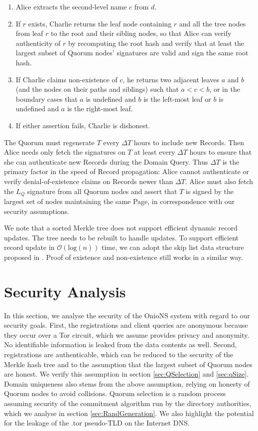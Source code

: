 \documentclass[conference]{IEEEtran}
\begin{document}
\begin{enumerate}
	\item Alice extracts the second-level name $ c $ from $ d $.
	\item If $ r $ exists, Charlie returns the leaf node containing $ r $ and all the tree nodes from leaf $ r $ to the root and their sibling nodes, so that Alice can verify authenticity of $ r $ by recomputing the root hash and verify that at least the largest subset of Quorum nodes' signatures are valid and sign the same root hash.	
	\item If Charlie claims non-existence of $ c $, he returns two adjacent leaves $ a $ and $ b $ (and the nodes on their paths and siblings) such that $ a < c < b $, or in the boundary cases that $ a $ is undefined and $ b $ is the left-most leaf or $ b $ is undefined and $ a $ is the right-most leaf.
	\item If either assertion fails, Charlie is dishonest.
\end{enumerate}

The Quorum must regenerate $ T $ every $ \Delta T $ hours to include new Records. Then Alice needs only fetch the signatures on $ T $ at least every $ \Delta T $ hours to ensure that she can authenticate new Records during the Domain Query. Thus $ \Delta T $ is the primary factor in the speed of Record propagation: Alice cannot authenticate or verify denial-of-existence claims on Records newer than $ \Delta T $. Alice must also fetch the $ L_{Q} $ signature from all Quorum nodes and assert that $ T $ is signed by the largest set of nodes maintaining the same Page, in correspondence with our security assumptions.

We note that a sorted Merkle tree does not support efficient dynamic record updates. The tree needs to be rebuilt to handle updates. To support efficient record update in $ \mathcal{O}(\mathrm{log}(n)) $ time, we can adopt the skip list data structure proposed in \cite{goodrich2001implementation}. Proof of existence and non-existence still works in a similar way.

\section{Security Analysis}
\label{sec:Analysis}

In this section, we analyse the security of the OnioNS system with regard to our security goals. First, the registrations and client queries are anonymous because they occur over a Tor circuit, which we assume provides privacy and anonymity. No identifiable information is leaked from the data contents as well. Second, registrations are authenticable, which can be reduced to the security of the Merkle hash tree and to the assumption that the largest subset of Quorum nodes are honest. We verify this assumption in section \ref{sec:QSelection} and \ref{sec:qSize}. Domain uniqueness also stems from the above assumption, relying on honesty of Quorum nodes to avoid collisions. Quorum selection is a random process assuming security of the commitment algorithm run by the directory authorities, which we analyse in section \ref{sec:RandGeneration}. We also highlight the potential for the leakage of the .tor pseudo-TLD on the Internet DNS.
\end{document}
